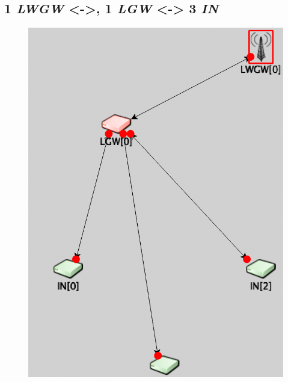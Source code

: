 \documentclass[a4paper]{article}
\begin{document}
\subsection{ 1 \textit{LWGW} <->, 1 \textit{LGW} <-> 3 \textit{IN} }
\begin{figure}[h!]
\centering
\includegraphics[scale=0.5]{cas_3.png} 
\end{figure}


\newpage
\end{document}
